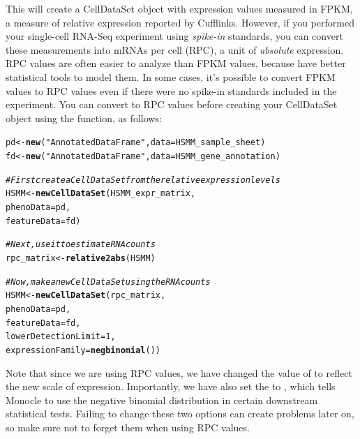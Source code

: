 \documentclass[10pt,oneside]{article}\usepackage[]{graphicx}\usepackage[]{color}
\makeatletter
\newcommand{\hlnum}[1]{\textcolor[rgb]{0.686,0.059,0.569}{#1}}%
\newcommand{\hlstr}[1]{\textcolor[rgb]{0.192,0.494,0.8}{#1}}%
\newcommand{\hlcom}[1]{\textcolor[rgb]{0.678,0.584,0.686}{\textit{#1}}}%
\newcommand{\hlstd}[1]{\textcolor[rgb]{0.345,0.345,0.345}{#1}}%
\newcommand{\hlkwb}[1]{\textcolor[rgb]{0.69,0.353,0.396}{#1}}%
\newcommand{\hlkwc}[1]{\textcolor[rgb]{0.333,0.667,0.333}{#1}}%
\newcommand{\hlkwd}[1]{\textcolor[rgb]{0.737,0.353,0.396}{\textbf{#1}}}%
\newenvironment{kframe}{%
 \def\at@end@of@kframe{}%
 \ifinner\ifhmode%
  \def\at@end@of@kframe{\end{minipage}}%
  \begin{minipage}{\columnwidth}%
 \fi\fi%
 \def\FrameCommand##1{\hskip\@totalleftmargin \hskip-\fboxsep
 \colorbox{shadecolor}{##1}\hskip-\fboxsep
     \hskip-\linewidth \hskip-\@totalleftmargin \hskip\columnwidth}%
 \MakeFramed {\advance\hsize-\width
   \@totalleftmargin\z@ \linewidth\hsize
   \@setminipage}}%
 {\par\unskip\endMakeFramed%
 \at@end@of@kframe}
\newenvironment{knitrout}{}{} %
\makeatother
\begin{document}
This will create a CellDataSet object with expression values measured in FPKM, a measure of relative expression reported by Cufflinks. However, if you performed your single-cell RNA-Seq experiment using \emph{spike-in} standards, you can convert these measurements into mRNAs per cell (RPC), a unit of \emph{absolute} expression. RPC values are often easier to analyze than FPKM values, because have better statistical tools to model them. In some cases, it's possible to convert FPKM values to RPC values even if there were no spike-in standards included in the experiment. You can convert to RPC values before creating your CellDataSet object using the  function, as follows:

\begin{knitrout}
\color{fgcolor}\begin{kframe}
\begin{alltt}
\hlstd{pd} \hlkwb{<-} \hlkwd{new}\hlstd{(}\hlstr{"AnnotatedDataFrame"}\hlstd{,} \hlkwc{data} \hlstd{= HSMM_sample_sheet)}
\hlstd{fd} \hlkwb{<-} \hlkwd{new}\hlstd{(}\hlstr{"AnnotatedDataFrame"}\hlstd{,} \hlkwc{data} \hlstd{= HSMM_gene_annotation)}

\hlcom{# First create a CellDataSet from the relative expression levels}
\hlstd{HSMM} \hlkwb{<-} \hlkwd{newCellDataSet}\hlstd{(HSMM_expr_matrix,}
                       \hlkwc{phenoData} \hlstd{= pd,}
                       \hlkwc{featureData} \hlstd{= fd)}

\hlcom{# Next, use it to estimate RNA counts}
\hlstd{rpc_matrix} \hlkwb{<-} \hlkwd{relative2abs}\hlstd{(HSMM)}

\hlcom{# Now, make a new CellDataSet using the RNA counts}
\hlstd{HSMM} \hlkwb{<-} \hlkwd{newCellDataSet}\hlstd{(rpc_matrix,}
                       \hlkwc{phenoData} \hlstd{= pd,}
                       \hlkwc{featureData} \hlstd{= fd,}
                       \hlkwc{lowerDetectionLimit}\hlstd{=}\hlnum{1}\hlstd{,}
                       \hlkwc{expressionFamily}\hlstd{=}\hlkwd{negbinomial}\hlstd{())}
\end{alltt}
\end{kframe}
\end{knitrout}

Note that since we are using RPC values, we have changed the value of  to reflect the new scale of expression. Importantly, we have also set the  to , which tells Monocle to use the negative binomial distribution in certain downstream statistical tests. Failing to change these two options can create problems later on, so make sure not to forget them when using RPC values.
\end{document}
